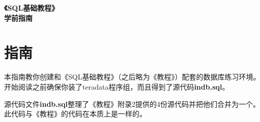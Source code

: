 \documentclass{article}
\begin{document}
	\begin{titlepage}
   		\begin{center}
      		\LARGE\textbf{《SQL基础教程》}\\
      		\LARGE\textbf{学前指南}
   		\end{center}
	\end{titlepage}

	\section*{指南}
		本指南教你创建和《SQL基础教程》（之后略为《教程》）配套的数据库练习环境。
		开始阅读之前确保你装了teradata程序组，而且得到了源代码\textbf{indb.sql}。

		源代码文件\textbf{indb.sql}整理了《教程》附录2提供的4份源代码并把他们合并为一个。此代码与《教程》的代码在本质上是一样的。





			



			
\end{document}
